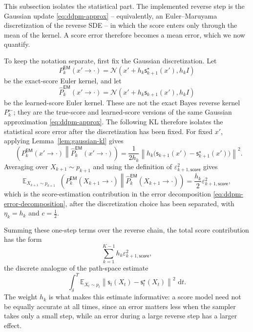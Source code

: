 \documentclass[10pt,a4paper]{amsart}
\numberwithin{equation}{section}
\DeclareMathOperator{\KL}{D_{\mathsf{KL}}}
\newcommand{\E}{\mathbb{E}}
\newcommand{\dd}{\,\mathrm{d}}
\newcommand{\Id}{I}
\newcommand{\wh}[1]{\widehat{#1}}
\newcommand{\eps}{\varepsilon}
\newcommand{\norm}[1]{\left\lVert #1 \right\rVert}
\newcommand{\sstar}{\mathsf{s}^{\star}}
\newcommand{\score}{\mathsf{s}}
\newcommand{\normal}[2]{\mathcal{N}\!\left(#1,#2\right)}
\begin{document}
This subsection isolates the statistical part.  The implemented reverse step is
the Gaussian update \eqref{eq:ddpm-approx} -- equivalently, an Euler--Maruyama
discretization of the reverse SDE -- in which the score enters only through the
mean of the kernel.  A score error therefore becomes a mean error, which we now
quantify.

To keep the notation separate, first fix the Gaussian discretization.  Let
\begin{equation}\label{eq:em-exact-score}
    P_k^{\mathsf{EM}}(x' \to \cdot)
    =
    \normal{x'+h_k\sstar_{k+1}(x')}{h_k\Id}
\end{equation}
be the exact-score Euler kernel, and let
\begin{equation}\label{eq:em-learned-score}
    \wh P_k^{\mathsf{EM}}(x' \to \cdot)
    =
    \normal{x'+h_k\score_{k+1}(x')}{h_k\Id}
\end{equation}
be the learned-score Euler kernel.  These are not the exact Bayes reverse
kernel $P_k^{\leftarrow}$; they are the true-score and learned-score versions of
the same Gaussian approximation \eqref{eq:ddpm-approx}.  The following KL
therefore isolates the statistical score error after the discretization has
been fixed.  For fixed $x'$, applying Lemma~\ref{lem:gaussian-kl} gives
\[
    \KL\!\left(
    P_k^{\mathsf{EM}}(x' \to \cdot)
    \middle\|
    \wh P_k^{\mathsf{EM}}(x' \to \cdot)
    \right)
    =
    \frac{1}{2h_k}
    \norm{h_k
    \bigl(\score_{k+1}(x')-\sstar_{k+1}(x')\bigr)}^2.
\]
Averaging over $X_{k+1}\sim p_{k+1}$ and using the definition of
$\eps_{k+1,\mathsf{score}}^2$ gives
\begin{equation}\label{eq:gaussian-score-step}
    \E_{X_{k+1}\sim p_{k+1}}
    \KL\!\left(
    P_k^{\mathsf{EM}}(X_{k+1} \to \cdot)
    \middle\|
    \wh P_k^{\mathsf{EM}}(X_{k+1} \to \cdot)
    \right)
    =
    \frac{h_k}{2}
    \eps_{k+1,\mathsf{score}}^2,
\end{equation}
which is the score-estimation contribution in the error decomposition
\eqref{eq:ddpm-error-decomposition}, after the discretization choice has been
separated, with $\eta_k=h_k$ and $c=\tfrac12$.

Summing these one-step terms over the reverse chain, the total score
contribution has the form
\begin{equation}\label{eq:score-sum}
    \sum_{k=1}^{K-1}h_k
    \eps_{k+1,\mathsf{score}}^2,
\end{equation}
the discrete analogue of the path-space estimate
\[
    \int_\delta^T
    \E_{X_t\sim p_t}
    \norm{\score_t(X_t)-\sstar_t(X_t)}^2
    \,\dd t.
\]
The weight $h_k$ is what makes this estimate informative: a score model need not
be equally accurate at all times, since an error matters less when the sampler
takes only a small step, while an error during a large reverse step has a larger
effect.
\end{document}
